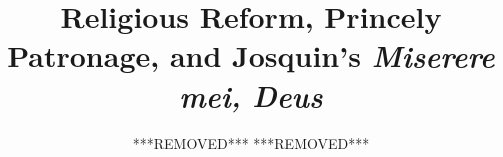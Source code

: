 
    \author{***REMOVED*** ***REMOVED***} %
    \newcommand{\authormail}{} %
    \newcommand{\matrikelnr}{} %
    \newcommand{\authoraddress}{} %
    
    \newcommand{\city}{} %
    \newcommand{\university}{} %
    \newcommand{\faculty}{} %
    \newcommand{\department}{} %
    \newcommand{\handindate}{} %
    
    \newcommand{\tutor}{} %
    \newcommand{\coursetype}{} %
    \newcommand{\coursetitle}{} %
    \newcommand{\coursenumber}{} %
    
    \title{
        Religious Reform, Princely Patronage, and Josquin's \emph{Miserere mei, Deus}} %
    \date{}
    \newcommand{\papertype}{} %
    \newcommand{\keywords}{} %
    
    \newcommand{\mainlanguage}{UKenglish} 
    \usepackage[ngerman, \mainlanguage]{babel}
%
%
\usepackage[babel]{csquotes}

\usepackage[style=mla,backend=biber]{biblatex}
  
%
%

